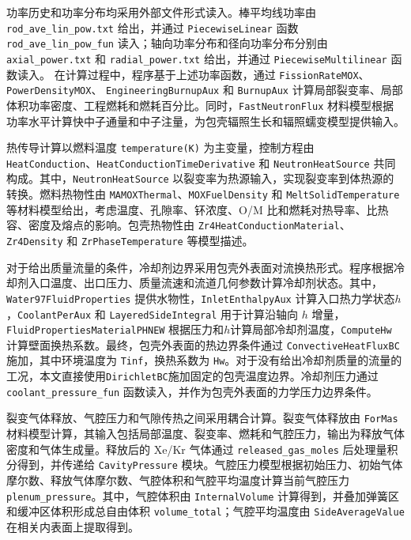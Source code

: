 功率历史和功率分布均采用外部文件形式读入。棒平均线功率由
\texttt{rod\_\allowbreak ave\_\allowbreak lin\_\allowbreak pow.\allowbreak txt}
给出，并通过 \texttt{PiecewiseLinear} 函数
\texttt{rod\_\allowbreak ave\_\allowbreak lin\_\allowbreak pow\_\allowbreak fun}
读入；轴向功率分布和径向功率分布分别由
\texttt{axial\_\allowbreak power.\allowbreak txt}
和
\texttt{radial\_\allowbreak power.\allowbreak txt}
给出，并通过 \texttt{PiecewiseMultilinear} 函数读入。
在计算过程中，程序基于上述功率函数，通过
\texttt{Fission\allowbreak RateMOX}、\texttt{PowerDensityMOX}、
\texttt{EngineeringBurnupAux} 和 \texttt{BurnupAux}
计算局部裂变率、局部体积功率密度、工程燃耗和燃耗百分比。同时，\texttt{FastNeutronFlux} 材料模型根据功率水平计算快中子通量和中子注量，为包壳辐照生长和辐照蠕变模型提供输入。

热传导计算以燃料温度 \texttt{temperature(K)} 为主变量，控制方程由 \texttt{HeatConduction}、\texttt{HeatConductionTimeDerivative} 和 \texttt{NeutronHeatSource} 共同构成。其中，\texttt{NeutronHeat\allowbreak Source} 以裂变率为热源输入，实现裂变率到体热源的转换。燃料热物性由 \texttt{MAMOXThermal}、\texttt{MOXFuelDensity} 和 \texttt{MeltSolidTemperature} 等材料模型给出，考虑温度、孔隙率、钚浓度、O/M 比和燃耗对热导率、比热容、密度及熔点的影响。包壳热物性由 \texttt{Zr4Heat\allowbreak ConductionMaterial}、\texttt{Zr4Density} 和 \texttt{ZrPhaseTemperature} 等模型描述。

对于给出质量流量的条件，冷却剂边界采用包壳外表面对流换热形式。程序根据冷却剂入口温度、出口压力、质量流速和流道几何参数计算冷却剂状态。其中，\texttt{Water97\allowbreak FluidProperties} 提供水物性，\texttt{InletEnthalpyAux} 计算入口热力学状态$h$，\texttt{CoolantPerAux} 和 \texttt{LayeredSideIntegral} 用于计算沿轴向 $h$ 增量，\texttt{FluidPropertiesMaterialPHNEW} 根据压力和$h$计算局部冷却剂温度，\texttt{ComputeHw} 计算壁面换热系数。最终，包壳外表面的热边界条件通过 \texttt{Convective\allowbreak HeatFluxBC} 施加，其中环境温度为 \texttt{Tinf}，换热系数为 \texttt{Hw}。对于没有给出冷却剂质量的流量的工况，本文直接使用\texttt{DirichletBC}施加固定的包壳温度边界。冷却剂压力通过 \texttt{coolant\_pressure\_fun} 函数读入，并作为包壳外表面的力学压力边界条件。

裂变气体释放、气腔压力和气隙传热之间采用耦合计算。裂变气体释放由 \texttt{ForMas} 材料模型计算，其输入包括局部温度、裂变率、燃耗和气腔压力，输出为释放气体密度和气体生成量。释放后的 Xe/Kr 气体通过 \texttt{released\_gas\_moles} 后处理量积分得到，并传递给 \texttt{CavityPressure} 模块。气腔压力模型根据初始压力、初始气体摩尔数、释放气体摩尔数、气腔体积和气腔平均温度计算当前气腔压力 \texttt{plenum\_pressure}。其中，气腔体积由 \texttt{InternalVolume} 计算得到，并叠加弹簧区和缓冲区体积形成总自由体积 \texttt{volume\_total}；气腔平均温度由 \texttt{SideAverageValue} 在相关内表面上提取得到。

